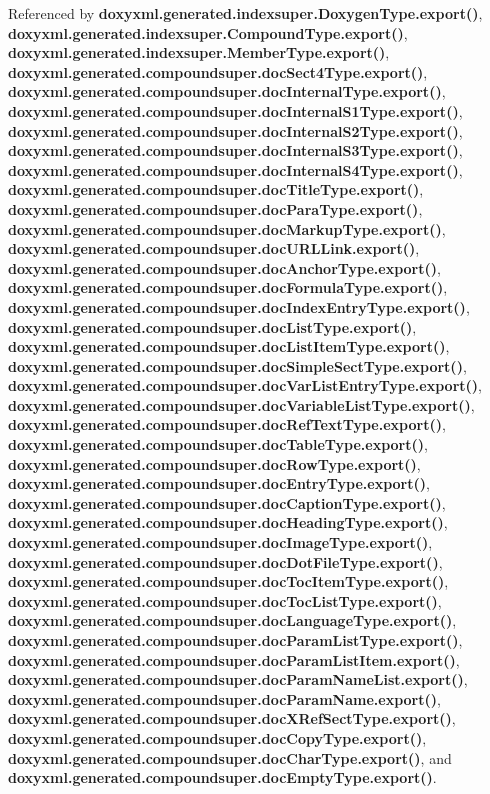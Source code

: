 Referenced by {\bf doxyxml.\+generated.\+indexsuper.\+Doxygen\+Type.\+export()}, {\bf doxyxml.\+generated.\+indexsuper.\+Compound\+Type.\+export()}, {\bf doxyxml.\+generated.\+indexsuper.\+Member\+Type.\+export()}, {\bf doxyxml.\+generated.\+compoundsuper.\+doc\+Sect4\+Type.\+export()}, {\bf doxyxml.\+generated.\+compoundsuper.\+doc\+Internal\+Type.\+export()}, {\bf doxyxml.\+generated.\+compoundsuper.\+doc\+Internal\+S1\+Type.\+export()}, {\bf doxyxml.\+generated.\+compoundsuper.\+doc\+Internal\+S2\+Type.\+export()}, {\bf doxyxml.\+generated.\+compoundsuper.\+doc\+Internal\+S3\+Type.\+export()}, {\bf doxyxml.\+generated.\+compoundsuper.\+doc\+Internal\+S4\+Type.\+export()}, {\bf doxyxml.\+generated.\+compoundsuper.\+doc\+Title\+Type.\+export()}, {\bf doxyxml.\+generated.\+compoundsuper.\+doc\+Para\+Type.\+export()}, {\bf doxyxml.\+generated.\+compoundsuper.\+doc\+Markup\+Type.\+export()}, {\bf doxyxml.\+generated.\+compoundsuper.\+doc\+U\+R\+L\+Link.\+export()}, {\bf doxyxml.\+generated.\+compoundsuper.\+doc\+Anchor\+Type.\+export()}, {\bf doxyxml.\+generated.\+compoundsuper.\+doc\+Formula\+Type.\+export()}, {\bf doxyxml.\+generated.\+compoundsuper.\+doc\+Index\+Entry\+Type.\+export()}, {\bf doxyxml.\+generated.\+compoundsuper.\+doc\+List\+Type.\+export()}, {\bf doxyxml.\+generated.\+compoundsuper.\+doc\+List\+Item\+Type.\+export()}, {\bf doxyxml.\+generated.\+compoundsuper.\+doc\+Simple\+Sect\+Type.\+export()}, {\bf doxyxml.\+generated.\+compoundsuper.\+doc\+Var\+List\+Entry\+Type.\+export()}, {\bf doxyxml.\+generated.\+compoundsuper.\+doc\+Variable\+List\+Type.\+export()}, {\bf doxyxml.\+generated.\+compoundsuper.\+doc\+Ref\+Text\+Type.\+export()}, {\bf doxyxml.\+generated.\+compoundsuper.\+doc\+Table\+Type.\+export()}, {\bf doxyxml.\+generated.\+compoundsuper.\+doc\+Row\+Type.\+export()}, {\bf doxyxml.\+generated.\+compoundsuper.\+doc\+Entry\+Type.\+export()}, {\bf doxyxml.\+generated.\+compoundsuper.\+doc\+Caption\+Type.\+export()}, {\bf doxyxml.\+generated.\+compoundsuper.\+doc\+Heading\+Type.\+export()}, {\bf doxyxml.\+generated.\+compoundsuper.\+doc\+Image\+Type.\+export()}, {\bf doxyxml.\+generated.\+compoundsuper.\+doc\+Dot\+File\+Type.\+export()}, {\bf doxyxml.\+generated.\+compoundsuper.\+doc\+Toc\+Item\+Type.\+export()}, {\bf doxyxml.\+generated.\+compoundsuper.\+doc\+Toc\+List\+Type.\+export()}, {\bf doxyxml.\+generated.\+compoundsuper.\+doc\+Language\+Type.\+export()}, {\bf doxyxml.\+generated.\+compoundsuper.\+doc\+Param\+List\+Type.\+export()}, {\bf doxyxml.\+generated.\+compoundsuper.\+doc\+Param\+List\+Item.\+export()}, {\bf doxyxml.\+generated.\+compoundsuper.\+doc\+Param\+Name\+List.\+export()}, {\bf doxyxml.\+generated.\+compoundsuper.\+doc\+Param\+Name.\+export()}, {\bf doxyxml.\+generated.\+compoundsuper.\+doc\+X\+Ref\+Sect\+Type.\+export()}, {\bf doxyxml.\+generated.\+compoundsuper.\+doc\+Copy\+Type.\+export()}, {\bf doxyxml.\+generated.\+compoundsuper.\+doc\+Char\+Type.\+export()}, and {\bf doxyxml.\+generated.\+compoundsuper.\+doc\+Empty\+Type.\+export()}.



